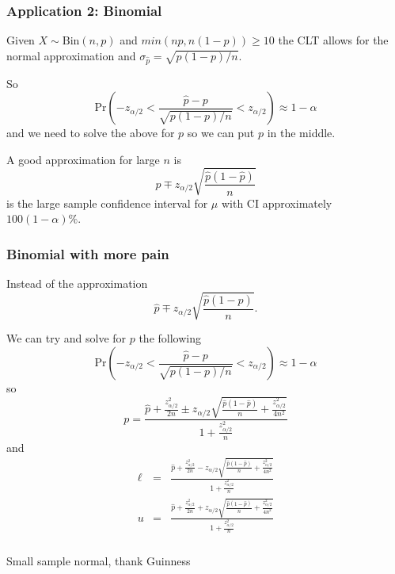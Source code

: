 \begin{frame}[fragile]\frametitle{Application 2: Binomial}

{\tiny
Given $X \sim \mbox{Bin}(n,p)$ and $min(np,n(1-p)) \geq 10$
the CLT allows for the normal approximation and
$\sigma_{\hat p} = \sqrt{p(1-p)/n}$.

\vspace{.1in}
So
$$\mbox{Pr}\left(-z_{\alpha/2} < \frac{\hat p -
    p}{\sqrt{p(1-p)/n}} < z_{\alpha/2}\right)  \approx
1-\alpha$$  
and we need to solve the above for $p$ so we can put
$p$ in the middle. 

\vspace{.1in}

A good approximation for large $n$ is
$$\hat{p} \mp z_{\alpha/2} \sqrt{\frac{\hat p (1-\hat{p})}{n}}$$
is the large sample confidence interval for $\mu$ with
CI approximately $100(1-\alpha)\%$.




}
\end{frame}


\begin{frame}[fragile]\frametitle{Binomial with more pain}

{\tiny
Instead of the approximation
$$\hat{p} \mp z_{\alpha/2} \sqrt{\frac{\hat p (1-\hat{p})}{n}}.$$


\vspace{.1in}
We can try and solve for $p$ the following 
$$\mbox{Pr}\left(-z_{\alpha/2} < \frac{\hat p -
    p}{\sqrt{p(1-p)/n}} < z_{\alpha/2}\right)  \approx
1-\alpha$$  
so
$$p = \frac{\hat{p} + \frac{z_{\alpha/2}^2}{2 n} \pm z_{\alpha/2}
  \sqrt{\frac{\hat p(1-\hat p)}{n} + \frac{z_{\alpha/2}^2}{4n^2}}}
{1+\frac{z_{\alpha/2}^2}{n}}$$ 
and
\begin{eqnarray*}
\ell &=& \frac{\hat{p} + \frac{z_{\alpha/2}^2}{2 n} - z_{\alpha/2}
  \sqrt{\frac{\hat p(1-\hat p)}{n} + \frac{z_{\alpha/2}^2}{4n^2}}}
{1+\frac{z_{\alpha/2}^2}{n}}\\
u &=& \frac{\hat{p} + \frac{z_{\alpha/2}^2}{2 n} + z_{\alpha/2}
  \sqrt{\frac{\hat p(1-\hat p)}{n} + \frac{z_{\alpha/2}^2}{4n^2}}}
{1+\frac{z_{\alpha/2}^2}{n}}
\end{eqnarray*}



}
\end{frame}

\begin{frame}[fragile]\frametitle{}
\begin{center}
{\Large Small sample normal, thank Guinness}

\end{center}
\end{frame}



